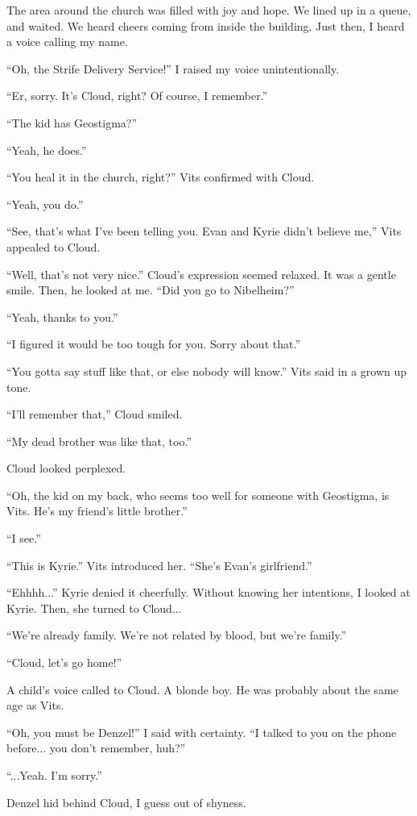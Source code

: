 \documentclass[oneside]{book}
\begin{document}
The area around the church was filled with joy and hope. We lined up in a queue, and waited. We heard cheers coming from inside the building. Just then, I heard a voice calling my name.

“Oh, the Strife Delivery Service!” I raised my voice unintentionally.

“Er, sorry. It’s Cloud, right? Of course, I remember.”

“The kid has Geostigma?”

“Yeah, he does.”

“You heal it in the church, right?” Vits confirmed with Cloud.

“Yeah, you do.”

“See, that’s what I’ve been telling you. Evan and Kyrie didn’t believe me,” Vits appealed to Cloud.

“Well, that’s not very nice.” Cloud’s expression seemed relaxed. It was a gentle smile. Then, he looked at me. “Did you go to Nibelheim?”

“Yeah, thanks to you.”

“I figured it would be too tough for you. Sorry about that.”

“You gotta say stuff like that, or else nobody will know.” Vits said in a grown up tone.

“I’ll remember that,” Cloud smiled.

“My dead brother was like that, too.”

Cloud looked perplexed.

“Oh, the kid on my back, who seems too well for someone with Geostigma, is Vits. He’s my friend’s little brother.”

“I see.”

“This is Kyrie.” Vits introduced her. “She’s Evan’s girlfriend.”

“Ehhhh...” Kyrie denied it cheerfully. Without knowing her intentions, I looked at Kyrie. Then, she turned to Cloud...

“We’re already family. We’re not related by blood, but we’re family.”

“Cloud, let’s go home!”

A child’s voice called to Cloud. A blonde boy. He was probably about the same age as Vits.

“Oh, you must be Denzel!” I said with certainty. “I talked to you on the phone before... you don’t remember, huh?”

“...Yeah. I’m sorry.”

Denzel hid behind Cloud, I guess out of shyness.
\end{document}

